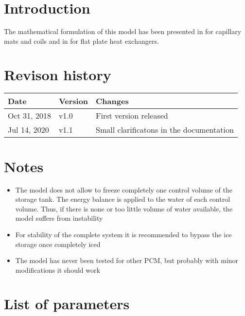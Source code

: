 \documentclass[english]{SPFReport}
\author{Dr. Daniel Carbonell}
\begin{document}
 


\section{Introduction}

The mathematical formulation of this model has been presented in \citet{carbonell_experimental_2018} for capillary mats and coils and in \citet{ICEEX_2017} for flat plate heat exchangers.

\section{Revison history}

  \begin{tabular}{|p{40mm}|p{15mm}|p{101mm}|}\hline    
    \textbf{Date} & \textbf{Version} & \textbf{Changes}  \\\hline
     Oct 31, 2018 & v1.0 & First version released \\\hline
     Jul 14, 2020 & v1.1 & Small clarificatons in the documentation \\\hline
  \end{tabular}

\section{Notes}

\begin{itemize}
\item The model does not allow to freeze completely one control volume of the storage tank. The energy balance is applied to the water of each control volume. Thus, if there is none or too little volume of water available, the model suffers from instability
\item For stability of the complete system it is recommended to bypass the ice storage once completely iced
\item The model has never been tested for other PCM, but probably with minor modifications it should work
\end{itemize}

\section{List of parameters}
\end{document}
